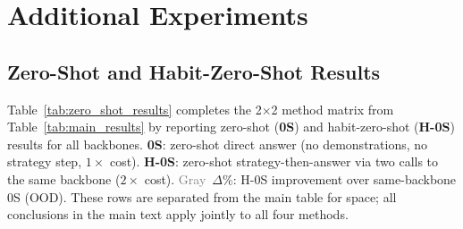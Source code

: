 \documentclass[11pt]{article}
\begin{document}
\section{Additional Experiments}
\label{app:extra_results}

\subsection{Zero-Shot and Habit-Zero-Shot Results}
\label{app:zero_shot_results}

Table~\ref{tab:zero_shot_results} completes the 2$\times$2 method matrix from Table~\ref{tab:main_results} by reporting zero-shot (\textbf{0S}) and habit-zero-shot (\textbf{H-0S}) results for all backbones.
\textbf{0S}: zero-shot direct answer (no demonstrations, no strategy step, $1\times$ cost).
\textbf{H-0S}: zero-shot strategy-then-answer via two calls to the same backbone ($2\times$ cost).
\textcolor{gray}{Gray}~$\Delta$\%: H-0S improvement over same-backbone 0S (OOD).
These rows are separated from the main table for space; all conclusions in the main text apply jointly to all four methods.
\end{document}
